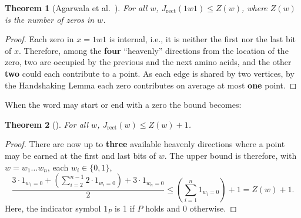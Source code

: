 \documentclass{article}
\newtheorem{theorem}{Theorem}
\begin{document}
	\begin{theorem}[{Agarwala et al.~\cite[Lemma 2.1]{ABDDFHMS97}}]\label{agarwala}
		For all $w$, $J_{\mathrm{rect}}(1w1)\le Z(w)$, where $Z(w)$ is the number of zeros in $w$.
	\end{theorem}
	\begin{proof}
		Each zero in $x=1w1$ is internal, i.e., it is neither the first nor the last bit of $x$.
		Therefore, among the \textbf{four} ``heavenly'' directions from the location of the zero,
		two are occupied by the previous and the next amino acids, and the other \textbf{two} could each contribute to a point.
		As each edge is shared by two vertices, by the Handshaking Lemma each zero contributes on average at most \textbf{one} point.
	\end{proof}
	When the word may start or end with a zero the bound becomes:
	\begin{theorem}[{\cite[Fact 1]{AICHHOLZER2003139}}]
		For all $w$, $J_{\mathrm{rect}}(w)\le Z(w)+1$.
	\end{theorem}
	\begin{proof}
		There are now up to \textbf{three} available heavenly directions where a point may be earned at the first and last bits of $w$.
		The upper bound is therefore, with $w=w_1\dots w_n$, each $w_i\in\{0,1\}$,
		\[
			\frac{3\cdot 1_{w_1=0}+(\sum_{i=2}^{n-1}2\cdot 1_{w_i=0})+3\cdot 1_{w_n=0}}2
			\le \left(\sum_{i=1}^n 1_{w_i=0}\right) + 1
			= Z(w)+1.
		\]
		Here, the indicator symbol $1_P$ is 1 if $P$ holds and 0 otherwise.
	\end{proof}
\end{document}
